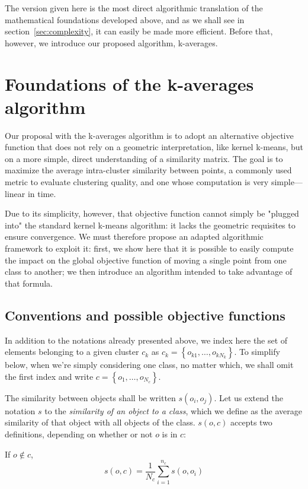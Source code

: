 \documentclass[a4paper,twoside]{article}
\newcommand{\cad}{---} %
\begin{document}
The version given here is the most direct algorithmic translation of the mathematical foundations developed above, and as we shall see in section~\ref{sec:complexity}, it can easily be made more efficient. Before that, however, we introduce our proposed algorithm, k-averages.


\section{Foundations of the k-averages algorithm} \label{sec:kaverages}


Our proposal with the k-averages algorithm is to adopt an alternative objective function that does not rely on a geometric interpretation, like kernel k-means, but on a more simple, direct understanding of a similarity matrix. The goal is to maximize the average intra-cluster similarity between points, a commonly used metric to evaluate clustering quality, and one whose computation is very simple\cad{}linear in time.

Due to its simplicity, however, that objective function cannot simply be "plugged into" the standard kernel k-means algorithm: it lacks the geometric requisites to ensure convergence. We must therefore propose an adapted algorithmic framework to exploit it: first, we show here that it is possible to easily compute the impact on the global objective function of moving a single point from one class to another; we then introduce an algorithm intended to take advantage of that formula.

\subsection{Conventions and possible objective functions}

In addition to the notations already presented above, we index here the set of elements belonging to a given cluster $c_k$ as $c_k = \left\{o_{k1}, \ldots, o_{kN_k}\right\}$. To simplify below, when we're simply considering one class, no matter
which, we shall omit the first index and write $c = \left\{o_1, \ldots, o_{N_c}\right\}$.

The similarity between objects shall be written $s\left(o_i, o_j\right)$.
Let us extend the notation $s$ to the \emph{similarity of an object to a
  class}, which we define as the average similarity of that object
with all objects of the class. $s(o,c)$ accepts two definitions,
depending on whether or not $o$ is in $c$:

If $o \notin c$,
\begin{equation}
  s\left(o,c\right) = \frac{1}{N_c} \sum_{i=1}^{n_c}s\left(o, o_i\right)
   \label{eq:soc_notinclass}
\end{equation}
\end{document}
